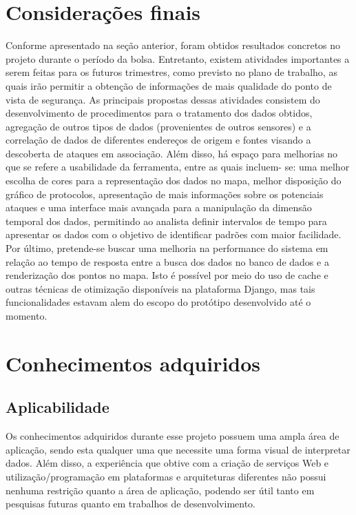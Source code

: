 \documentclass[%
        Portuguese,%
        ]
{ic-tese-v2}
\begin{document}
\chapter{Considerações finais}
Conforme apresentado na seção anterior, foram obtidos resultados concretos no projeto durante o período da bolsa. Entretanto, existem atividades importantes a serem feitas para os futuros trimestres, como previsto no plano de trabalho, as quais irão permitir a obtenção de informações de mais qualidade do ponto de vista de segurança. As principais propostas dessas atividades consistem do desenvolvimento de procedimentos para o tratamento dos dados obtidos, agregação de outros tipos de dados (provenientes de outros sensores) e a correlação de dados de diferentes endereços de origem e fontes visando a descoberta de ataques em associação.
Além disso, há espaço para melhorias no que se refere a usabilidade da ferramenta, entre as quais incluem- se: uma melhor escolha de cores para a representação dos dados no mapa, melhor disposição do gráfico de protocolos, apresentação de mais informações sobre os potenciais ataques e uma interface mais avançada para a manipulação da dimensão temporal dos dados, permitindo ao analista definir intervalos de tempo para apresentar os dados com o objetivo de identificar padrões com maior facilidade.
Por último, pretende-se buscar uma melhoria na performance do sistema em relação ao tempo de resposta entre a busca dos dados no banco de dados e a renderização dos pontos no mapa. Isto é possível por meio do uso de cache e outras técnicas de otimização disponíveis na plataforma Django, mas tais funcionalidades estavam alem do escopo do protótipo desenvolvido até o momento.


\chapter{Conhecimentos adquiridos}
\section{Aplicabilidade}
Os conhecimentos adquiridos durante esse projeto possuem uma ampla área de aplicação, sendo esta qualquer uma que necessite uma forma visual de interpretar dados. Além disso, a experiência que obtive com a criação de serviços Web e utilização/programação em plataformas e arquiteturas diferentes não possui nenhuma restrição quanto a área de aplicação, podendo ser útil tanto em pesquisas futuras quanto em trabalhos de desenvolvimento.
\end{document}

